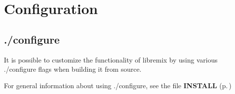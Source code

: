\section{Configuration}
\label{group__configuration}
\subsection{./configure}\label{configure}
It is possible to customize the functionality of libremix by using various ./configure flags when building it from source.

For general information about using ./configure, see the file {\bf INSTALL }{\rm (p.\,\pageref{group__install})} 

